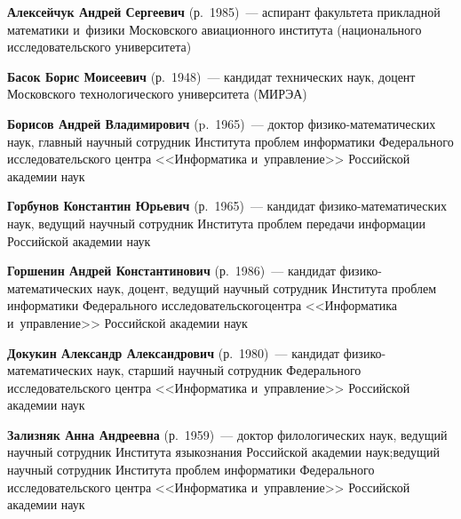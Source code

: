 \begin{multicols}{2}

 \noindent
 \textbf{Алексейчук Андрей Сергеевич} (р.\ 1985)~---
  аспирант факультета прикладной математики и~физики Мос\-ков\-ско\-го авиационного 
  института (национального исследовательского университета)

  \vspace*{3pt}
  
  \noindent
\textbf{Басок Борис Моисеевич} (р.\ 1948)~--- 
кандидат технических наук, доцент Московского технологического университета (МИРЭА)

\vspace*{3pt}

\noindent
\textbf{Борисов Андрей Владимирович} (p.\ 1965)~---
 доктор фи\-зи\-ко-ма\-те\-ма\-ти\-че\-ских наук, 
 главный научный сотрудник Института проб\-лем информатики Федерального 
 исследовательского центра <<Информатика и~управ\-ление>> Российской академии наук
 
 \vspace*{3pt}
 
 \noindent
\textbf{Горбунов Константин Юрьевич} (р.\ 1965)~---
 кандидат фи\-зи\-ко-ма\-те\-ма\-ти\-че\-ских наук, ведущий научный 
 сотрудник Института проб\-лем передачи информации Российской академии наук
 
 \vspace*{3pt}
 
 \noindent
\textbf{Горшенин Андрей Константинович} (р.\ 1986)~--- 
кандидат фи\-зи\-ко-ма\-те\-ма\-ти\-че\-ских наук, доцент,
ведущий научный сотрудник Института проб\-лем информатики Федерального 
исследовательского\linebreak центра <<Информатика и~управ\-ле\-ние>> Российской академии наук

\vspace*{3pt}
 
  \noindent
\textbf{Докукин Александр Александрович} (р.\ 1980)~---
  кандидат фи\-зи\-ко-ма\-те\-ма\-ти\-че\-ских наук, старший научный 
  сотрудник Федерального исследовательского центра <<Информатика и~управ\-ле\-ние>> 
  Российской академии наук
  
  \vspace*{3pt}
  
 \noindent
\textbf{Зализняк Анна Андреевна} (р.\ 1959)~--- 
доктор филологических наук, ведущий научный сотрудник Института языкознания 
Российской академии \mbox{наук};\linebreak ведущий научный сотрудник Института проб\-лем 
информатики Федерального исследовательского центра <<Информатика и~управ\-ле\-ние>> 
Российской академии наук


\end{multicols}
